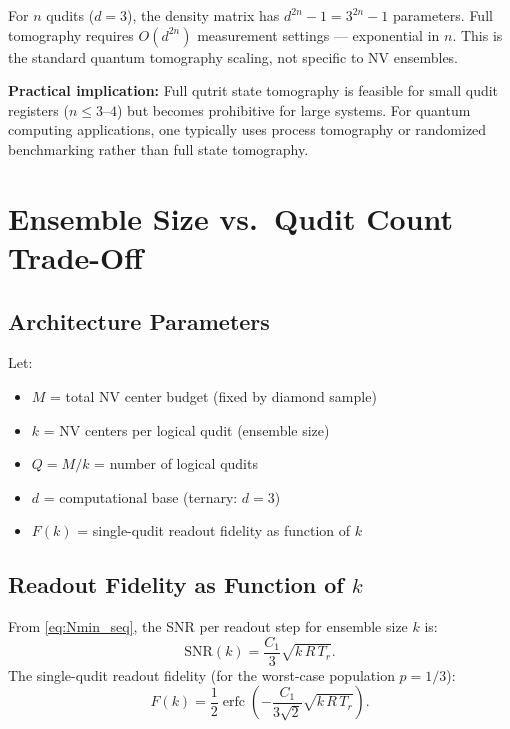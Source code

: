 \documentclass[11pt,letterpaper]{article}
\begin{document}
For $n$ qudits ($d=3$), the density matrix has $d^{2n} - 1 = 3^{2n} - 1$
parameters.  Full tomography requires $O(d^{2n})$ measurement settings ---
exponential in $n$.  This is the standard quantum tomography scaling,
not specific to NV ensembles.

\textbf{Practical implication:} Full qutrit state tomography is feasible for
small qudit registers ($n \leq 3$--$4$) but becomes prohibitive for large
systems.  For quantum computing applications, one typically uses
process tomography or randomized benchmarking rather than full state
tomography.


\section{Ensemble Size vs.\ Qudit Count Trade-Off}
\label{sec:tradeoff}

\subsection{Architecture Parameters}

Let:
\begin{itemize}
  \item $M$ = total NV center budget (fixed by diamond sample)
  \item $k$ = NV centers per logical qudit (ensemble size)
  \item $Q = M/k$ = number of logical qudits
  \item $d$ = computational base (ternary: $d=3$)
  \item $F(k)$ = single-qudit readout fidelity as function of $k$
\end{itemize}

\subsection{Readout Fidelity as Function of $k$}

From \cref{eq:Nmin_seq}, the SNR per readout step for ensemble size $k$ is:
\begin{equation}
  \text{SNR}(k) = \frac{C_1}{3} \sqrt{k \, R \, T_r}.
\end{equation}
The single-qudit readout fidelity (for the worst-case population $p = 1/3$):
\begin{equation}
  F(k) = \frac{1}{2}\operatorname{erfc}\!\left(
    -\frac{C_1}{3\sqrt{2}} \sqrt{k \, R \, T_r}
  \right).
  \label{eq:Fk}
\end{equation}
\end{document}

